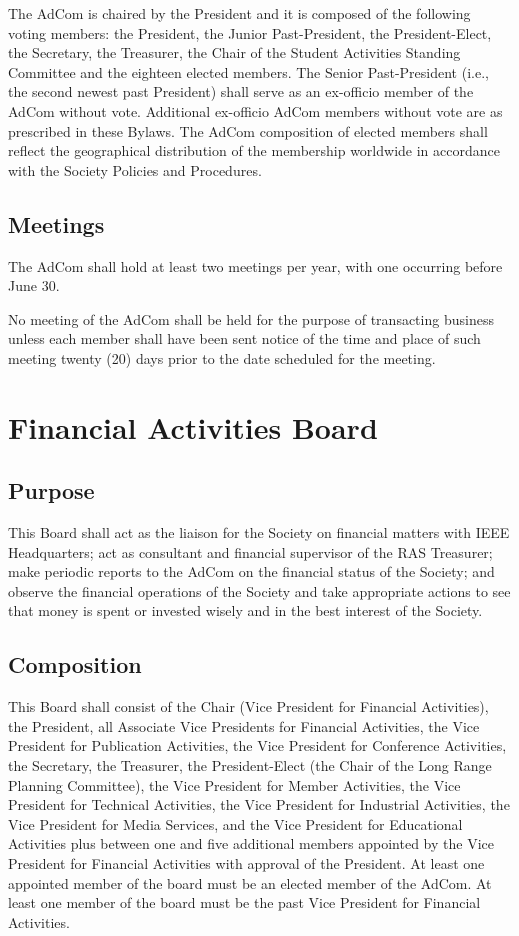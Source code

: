 \documentclass[10pt]{article}
\begin{document}
The AdCom is chaired by the President and it is composed of the following voting members: the President, the Junior Past-President, the President-Elect, the Secretary, the Treasurer, the Chair of the Student Activities Standing Committee and the eighteen elected members. The Senior Past-President (i.e., the second newest past President) shall serve as an ex-officio member of the AdCom without vote. Additional ex-officio AdCom members without vote are as prescribed in these Bylaws. The AdCom composition of elected members shall reflect the geographical distribution of the membership worldwide in accordance with the Society Policies and Procedures.

\subsection{Meetings}

The AdCom shall hold at least two meetings per year,  with one occurring before June 30.

No meeting of the AdCom shall be held for the purpose of transacting business unless each member shall have been sent notice of the time and place of such meeting twenty (20) days prior to the date scheduled for the meeting. 


\section{Financial Activities Board}
\label{FAB}

\subsection{Purpose}
This Board shall act as the liaison for the Society on financial matters with IEEE Headquarters; act as consultant and financial supervisor of the RAS Treasurer; make periodic reports to the AdCom on the financial status of the Society; and observe the financial operations of the Society and take appropriate actions to see that money is spent or invested wisely and in the best interest of the Society.


\subsection{Composition}
This Board shall consist of the Chair (Vice President for Financial Activities), the President,  all Associate Vice Presidents for Financial Activities, the Vice President for Publication Activities, the Vice President for Conference Activities, the Secretary, the Treasurer, the President-Elect (the Chair of the Long Range Planning Committee), the Vice President for Member Activities, the Vice President for Technical Activities, the Vice President for Industrial Activities, the Vice President for Media Services, and the Vice President for Educational Activities plus between one and five additional members appointed by the Vice President for Financial Activities with approval of the President. At least one appointed member of the board must be an elected member of the AdCom. At least one member of the board must be the past Vice President for Financial Activities.
\end{document}
